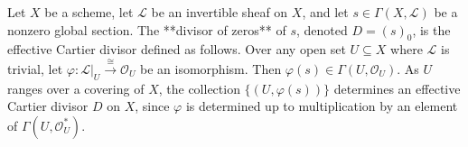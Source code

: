 Let $X$ be a scheme, let $\mathcal{L}$ be an invertible sheaf on $X$, and let $s \in \Gamma(X, \mathcal{L})$ be a nonzero global section. The **divisor of zeros** of $s$, denoted $D = (s)_0$, is the effective Cartier divisor defined as follows. Over any open set $U \subseteq X$ where $\mathcal{L}$ is trivial, let $\varphi: \mathcal{L}|_U \xrightarrow{\cong} \mathcal{O}_U$ be an isomorphism. Then $\varphi(s) \in \Gamma(U, \mathcal{O}_U)$. As $U$ ranges over a covering of $X$, the collection $\{(U, \varphi(s))\}$ determines an effective Cartier divisor $D$ on $X$, since $\varphi$ is determined up to multiplication by an element of $\Gamma(U, \mathcal{O}_U^*)$.

